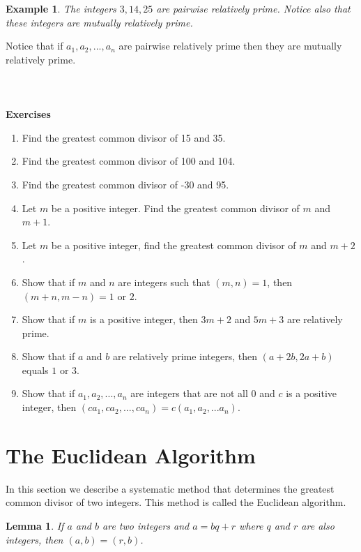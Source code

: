 \documentclass[12pt,letterpaper]{book}
\newtheorem{lemma}{Lemma}
\newtheorem{example}{Example}
\begin{document}
\begin{example}
The integers $3,14,25$ are pairwise relatively prime.  Notice also
that these integers are mutually relatively prime.
\end{example}

\par Notice that if $a_1,a_2,...,a_n$ are pairwise relatively prime then they are mutually relatively prime.
\\
\\
\\
\\
\textbf{Exercises}
\begin{enumerate}
\item{Find the greatest common divisor of 15 and 35.} \item{Find
the greatest common divisor of 100 and 104.} \item{Find the greatest
common divisor of -30 and 95.}\item{Let $m$ be a positive integer.
Find the greatest common divisor of $m$ and $m+1$.}\item{Let $m$ be
a positive integer, find the greatest common divisor of $m$ and
$m+2$.} \item{Show that if $m$ and $n$ are integers such that
$(m,n)=1$, then\\ $(m+n,m-n)=1$ or $2$.}\item{Show that if $m$ is a
positive integer, then $3m+2$ and $5m+3$ are relatively
prime.}\item{Show that if $a$ and $b$ are relatively prime integers,
then $(a+2b,2a+b)$ equals $1$ or $3$.} \item{Show that if $a_1,a_2,...,a_n$
are integers that are not all 0 and $c$ is a positive integer, then
$(ca_1,ca_2,...,ca_n)=c(a_1,a_2,...a_n).$}
\end{enumerate}

\newpage

\section{The Euclidean Algorithm}
In this section we describe a systematic method that determines the
greatest common divisor of two integers. This method is called the
Euclidean algorithm.
\begin{lemma}\label{lem1}
If $a$ and $b$ are two integers and $a=bq+r$ where $q$ and $r$
are also integers, then $(a,b)=(r,b)$.
\end{lemma}
\end{document}
